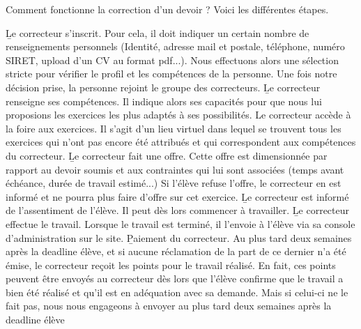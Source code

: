 ﻿Comment fonctionne la correction d'un devoir ? Voici les différentes étapes.

\begin{enumerate}
	\li \b{Le correcteur s'inscrit.} Pour cela, il doit indiquer un certain nombre de renseignements personnels  (Identité, adresse mail et postale, téléphone, numéro SIRET, upload d'un CV au format pdf...). Nous effectuons alors une sélection stricte pour vérifier le profil et les compétences de la personne. Une fois notre décision prise, la personne rejoint le groupe des correcteurs.
	\li\b{Le correcteur renseigne ses compétences.} Il indique alors ses capacités pour que nous lui proposions les exercices les plus adaptés à ses possibilités.
	\li \b{ Le correcteur accède à la foire aux exercices.} Il s'agit d'un lieu virtuel dans lequel se trouvent tous les exercices qui n'ont pas encore été attribués et qui correspondent aux compétences du correcteur.
	\li \b{Le correcteur fait une offre.}  Cette offre est dimensionnée par rapport au devoir soumis et aux contraintes qui lui sont associées (temps avant échéance, durée de travail estimé...) Si l'élève refuse l'offre, le correcteur en est informé et ne pourra plus faire d'offre sur cet exercice.
	\li \b{Le correcteur est informé de l'assentiment de l'élève.} Il peut dès lors commencer à travailler.
	\li \b{Le correcteur effectue le travail.} Lorsque le travail est terminé, il l'envoie à l'élève via sa console d'administration sur le site.
	\li \b{Paiement du correcteur.} Au plus tard deux semaines après la deadline élève, et si aucune réclamation de la part de ce dernier n'a été émise, le correcteur reçoit les points pour le travail réalisé. En fait, ces points peuvent être envoyés au correcteur dès lors que l'élève confirme que le travail a bien été réalisé et qu'il est en adéquation avec sa demande. Mais si celui-ci ne le fait pas, nous nous engageons à envoyer au plus tard deux semaines après la deadline élève
\end{enumerate}